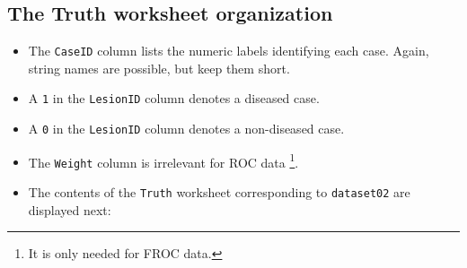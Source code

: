 \documentclass[]{book}
\providecommand{\tightlist}{%
  \setlength{\itemsep}{0pt}\setlength{\parskip}{0pt}}
\let\rmarkdownfootnote\footnote%
\def\footnote{\protect\rmarkdownfootnote}
\begin{document}
\hypertarget{the-truth-worksheet-organization}{%
\subsection{The Truth worksheet organization}\label{the-truth-worksheet-organization}}

\begin{itemize}
\tightlist
\item
  The \texttt{CaseID} column lists the numeric labels identifying each case. Again, string names are possible, but keep them short.
\item
  A \texttt{1} in the \texttt{LesionID} column denotes a diseased case.
\item
  A \texttt{0} in the \texttt{LesionID} column denotes a non-diseased case.
\item
  The \texttt{Weight} column is irrelevant for ROC data \footnote{It is only needed for FROC data.}.
\item
  The contents of the \texttt{Truth} worksheet corresponding to \texttt{dataset02} are displayed next:
\end{itemize}
\end{document}

